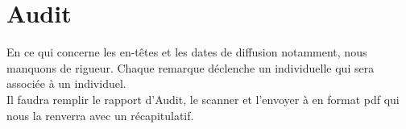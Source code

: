 \documentclass [a4paper] {article}
\begin{document}
\section{Audit}
En ce qui concerne les en-têtes et les dates de diffusion notamment, nous manquons de rigueur. Chaque remarque déclenche un \FFT{} individuelle qui sera associée à un \OC{} individuel. \\
Il faudra remplir le rapport d'Audit, le scanner et l'envoyer à \nomTuteurQualite{} en format pdf qui nous la renverra avec un récapitulatif.
\end{document}
